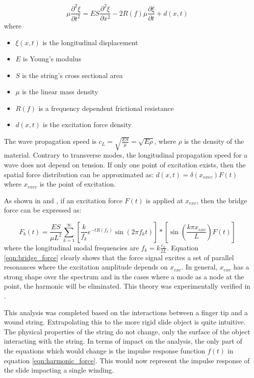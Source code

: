 \documentclass[main.tex]{subfiles}
\begin{document}
\begin{equation}
    \mu \frac{\partial^2 \xi}{\partial t^2} = ES\frac{\partial^2 \xi}{\partial x^2} - 2R(f)\mu \frac{\partial \xi}{\partial t} + d(x,t)
    \label{eqn:longitudinal_PDE}
\end{equation}
where
\begin{itemize}
    \item $\xi(x,t)$ is the longitudinal displacement
    \item $E$ is Young's modulus
    \item $S$ is the string's cross sectional area
    \item $\mu$ is the linear mass density
    \item $R(f)$ is a frequency dependent frictional resistance
    \item $d(x,t)$ is the excitation force density
\end{itemize}
The wave propagation speed is $c_L = \sqrt{\frac{ES}{\mu}} = \sqrt{E \rho}$, where $\rho$ is the density of the material. Contrary to transverse modes, the longitudinal propagation speed for a wave does not depend on tension. If only one point of excitation exists, then the spatial force distribution can be approximated as: $d(x,t) = \delta(x_{exec})F(t)$ where $x_{exec}$ is the point of excitation.

As shown in  and , if an excitation force $F(t)$ is applied at $x_{exc}$, then the bridge force can be expressed as:

\begin{equation}
    F_b(t) = \frac{ES}{\mu L^2} \sum_{k = 1}^{\infty} \left[\frac{k}{f_k} e^{-t R(f_k)} \sin(2\pi f_k t)\right] \ast \left[ \sin\left(\frac{k \pi x_{exc}}{L}\right) F(t)\right]
    \label{eqn:bridge_force}
\end{equation}
where the longitudinal modal frequencies are $f_k = k \frac{c_L}{2L}$. Equation \ref{eqn:bridge_force} clearly shows that the force signal excites a set of parallel resonances where the excitation amplitude depends on $x_{exc}$. In general, $x_{exc}$ has a strong shape over the spectrum and in the cases where a mode as a node at the point, the harmonic will be eliminated. This theory was experimentally verified in . 

This analysis was completed based on the interactions between a finger tip and a wound string. Extrapolating this to the more rigid slide object is quite intuitive. The physical properties of the string do not change, only the surface of the object interacting with the string. In terms of impact on the analysis, the only part of the equations which would change is the impulse response function $f(t)$ in equation \ref{eqn:harmonic_force}. This would now represent the impulse response of the slide impacting a single winding.
\end{document}
